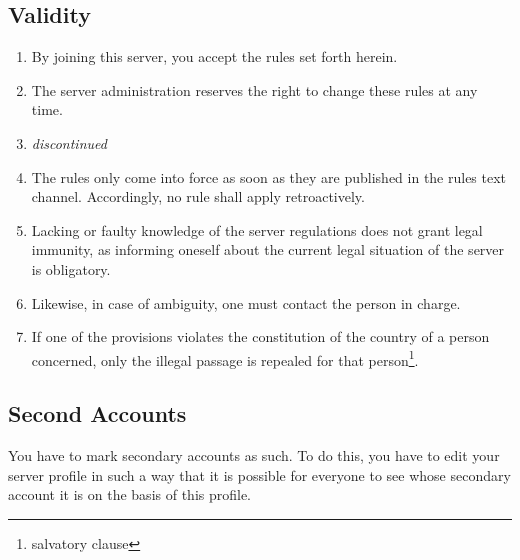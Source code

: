 \documentclass{article}
\begin{document}
\subsection{Validity}
\begin{enumerate}[(1)]
	\item By joining this server, you accept the rules set forth herein.
	\item The server administration reserves the right to change these rules at any time.
	\item \textit{discontinued}
	\item The rules only come into force as soon as they are published in the rules text channel. Accordingly, no rule shall apply retroactively.
	\item Lacking or faulty knowledge of the server regulations does not grant legal immunity, as informing oneself about the current legal situation of the server is obligatory.
	\item Likewise, in case of ambiguity, one must contact the person in charge.
	\item If one of the provisions violates the constitution of the country of a person concerned, only the illegal passage is repealed for that person\footnote{salvatory clause}.	
\end{enumerate}

\subsection{Second Accounts}
You have to mark secondary accounts as such. To do this, you have to edit your server profile in such a way that it is possible for everyone to see whose secondary account it is on the basis of this profile.
\end{document}
